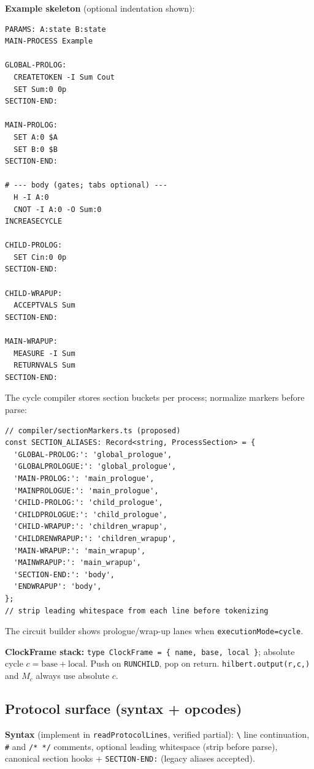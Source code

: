 \documentclass[11pt,a4paper]{article}
\begin{document}
\textbf{Example skeleton} (optional indentation shown):
\begin{lstlisting}[style=protocol]
PARAMS: A:state B:state
MAIN-PROCESS Example

GLOBAL-PROLOG:
  CREATETOKEN -I Sum Cout
  SET Sum:0 0p
SECTION-END:

MAIN-PROLOG:
  SET A:0 $A
  SET B:0 $B
SECTION-END:

# --- body (gates; tabs optional) ---
  H -I A:0
  CNOT -I A:0 -O Sum:0
INCREASECYCLE

CHILD-PROLOG:
  SET Cin:0 0p
SECTION-END:

CHILD-WRAPUP:
  ACCEPTVALS Sum
SECTION-END:

MAIN-WRAPUP:
  MEASURE -I Sum
  RETURNVALS Sum
SECTION-END:
\end{lstlisting}

The cycle compiler stores section buckets per process; normalize markers before parse:
\begin{lstlisting}[style=code]
// compiler/sectionMarkers.ts (proposed)
const SECTION_ALIASES: Record<string, ProcessSection> = {
  'GLOBAL-PROLOG:': 'global_prologue',
  'GLOBALPROLOGUE:': 'global_prologue',
  'MAIN-PROLOG:': 'main_prologue',
  'MAINPROLOGUE:': 'main_prologue',
  'CHILD-PROLOG:': 'child_prologue',
  'CHILDPROLOGUE:': 'child_prologue',
  'CHILD-WRAPUP:': 'children_wrapup',
  'CHILDRENWRAPUP:': 'children_wrapup',
  'MAIN-WRAPUP:': 'main_wrapup',
  'MAINWRAPUP:': 'main_wrapup',
  'SECTION-END:': 'body',
  'ENDWRAPUP': 'body',
};
// strip leading whitespace from each line before tokenizing
\end{lstlisting}
The circuit builder shows prologue/wrap-up lanes when \texttt{executionMode=cycle}.

\textbf{ClockFrame stack:} \texttt{type ClockFrame = \{ name, base, local \}}; absolute cycle $c=\mathrm{base}+\mathrm{local}$. Push on \texttt{RUNCHILD}, pop on return. \texttt{hilbert.output(r,c,\cdot)} and $M_c$ always use absolute $c$.

\subsection{Protocol surface (syntax + opcodes)}

\textbf{Syntax} (implement in \texttt{readProtocolLines}, verified partial): \texttt{\textbackslash} line continuation, \texttt{\#} and \texttt{/* */} comments, optional leading whitespace (strip before parse), canonical section hooks + \texttt{SECTION-END:} (legacy aliases accepted).
\end{document}
